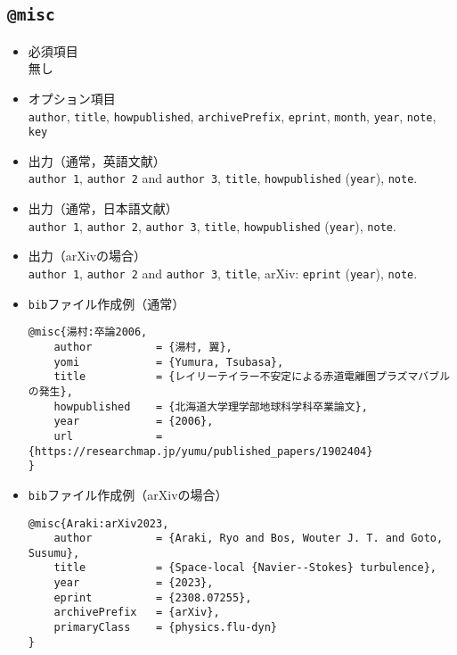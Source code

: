 \documentclass[a4paper,fleqn,uplatex,dvipdfmx]{jsarticle}
\begin{document}
\subsection{\texttt{@misc}}
\label{ssec:misc}
\begin{screen}
    \begin{itemize}
        \item 必須項目 \\
        無し
        \item オプション項目 \\
        \verb|author|, \verb|title|, \verb|howpublished|, \verb|archivePrefix|, \verb|eprint|, \verb|month|, \verb|year|, \verb|note|, \verb|key|
        \item 出力（通常，英語文献） \\
            \colorbox[gray]{0.8}{\texttt{author 1}}, \colorbox[gray]{0.8}{\texttt{author 2}} and \colorbox[gray]{0.8}{\texttt{author 3}}, \colorbox[gray]{0.8}{\texttt{title}}, \colorbox[gray]{0.8}{\texttt{howpublished}} (\colorbox[gray]{0.8}{\texttt{year}}), \colorbox[gray]{0.8}{\texttt{note}}.
        \item 出力（通常，日本語文献） \\
            \colorbox[gray]{0.8}{\texttt{author 1}}, \colorbox[gray]{0.8}{\texttt{author 2}}, \colorbox[gray]{0.8}{\texttt{author 3}}, \colorbox[gray]{0.8}{\texttt{title}}, \colorbox[gray]{0.8}{\texttt{howpublished}} (\colorbox[gray]{0.8}{\texttt{year}}), \colorbox[gray]{0.8}{\texttt{note}}.
        \item 出力（arXivの場合） \\
            \colorbox[gray]{0.8}{\texttt{author 1}}, \colorbox[gray]{0.8}{\texttt{author 2}} and \colorbox[gray]{0.8}{\texttt{author 3}}, \colorbox[gray]{0.8}{\texttt{title}}, arXiv: \colorbox[gray]{0.8}{\texttt{eprint}} (\colorbox[gray]{0.8}{\texttt{year}}), \colorbox[gray]{0.8}{\texttt{note}}.
        \item \verb|bib|ファイル作成例（通常） \vspace{-3mm}
\begin{verbatim}
@misc{湯村:卒論2006,
    author          = {湯村, 翼},
    yomi            = {Yumura, Tsubasa},
    title           = {レイリーテイラー不安定による赤道電離圏プラズマバブルの発生},
    howpublished    = {北海道大学理学部地球科学科卒業論文},
    year            = {2006},
    url             = {https://researchmap.jp/yumu/published_papers/1902404}
}
\end{verbatim}
        \item \verb|bib|ファイル作成例（arXivの場合） \vspace{-3mm}
\begin{verbatim}
@misc{Araki:arXiv2023,
    author          = {Araki, Ryo and Bos, Wouter J. T. and Goto, Susumu},
    title           = {Space-local {Navier--Stokes} turbulence}, 
    year            = {2023},
    eprint          = {2308.07255},
    archivePrefix   = {arXiv},
    primaryClass    = {physics.flu-dyn}
}
\end{verbatim}
    \end{itemize}
\end{screen}
\end{document}
